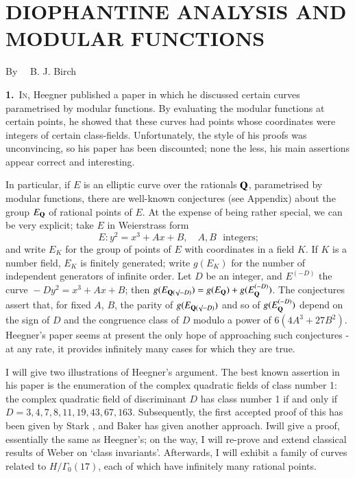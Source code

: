 \chapter[\textsc{B. J. Birch} : Diophantine Analysis and Modular Functions]{DIOPHANTINE ANALYSIS AND MODULAR FUNCTIONS}\label{art03}

\begin{center}
By~~ B. J. Birch
\end{center}


\setcounter{pageoriginal}{34}
\noindent
{\bf 1.}~\textsc{In}, Heegner published a paper \cite{art03-key5} in which he discussed certain curves parametrised by modular functions. By evaluating the modular functions at certain points, he showed that these curves had points whose coordinates were integers of certain class-fields. Unfortunately, the style of his proofs was unconvincing, so his paper has been discounted; none the less, his main assertions appear correct and interesting.

In particular, if $E$ is an elliptic curve over the rationals $\mathbf{Q}$, parametrised by modular functions, there are well-known conjectures (see Appendix) about the group $E_{\mathbf{Q}}$ of rational points of $E$. At the expense of being rather special, we can be very explicit; take $E$ in Weierstrass form
$$
E:y^{2}=x^{3}+Ax+B,\quad A, B \text{~ integers;}
$$
and write $E_{K}$ for the group of points of $E$ with coordinates in a field $K$. If $K$ is a number field, $E_{K}$ is finitely generated; write $g(E_{K})$ for the number of independent generators of infinite order. Let $D$ be an integer, and $E^{(-D)}$ the curve ${}-Dy^{2}=x^{3}+Ax+B$; then $g(E_{\mathbf{Q}(\surd-D)})=g(E_{\mathbf{Q}})+g(E_{\mathbf{Q}}^{(-D)})$. The conjectures assert that, for fixed $A$, $B$, the parity of $g(E_{\mathbf{Q}(\surd-D)})$ and so of $g(E_{\mathbf{Q}}^{(-D)})$ depend on the sign of $D$ and the congruence class of $D$ modulo a power of $6(4A^{3}+27B^{2})$. Heegner's paper seems at present the only hope of approaching such conjectures - at any rate, it provides infinitely many cases for which they are true.

I will give two illustrations of Heegner's argument. The best known assertion in his paper is the enumeration of the complex quadratic fields of class number 1: the complex quadratic field of discriminant $D$ has class number 1 if and only if $D=3,4,7,8,11,19,43,67,163$. Subsequently, the first accepted proof of this has been given by Stark \cite{art03-key7}, and Baker \cite{art03-key1} has given another approach. I\pageoriginale will give a proof, essentially the same as Heegner's; on the way, I will re-prove and extend classical results of Weber \cite{art03-key9} on `class invariants'. Afterwards, I will exhibit a family of curves related to $H/\Gamma_{0}(17)$, each of which have infinitely many rational points.

